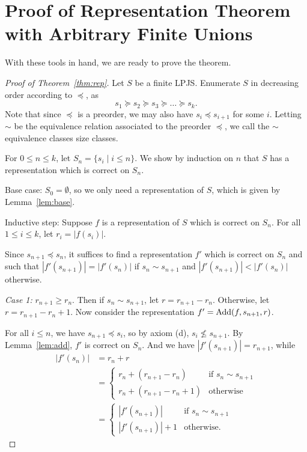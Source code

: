 \documentclass[12pt]{article}
\theoremstyle{definition}
\begin{document}
\section{Proof of Representation Theorem with Arbitrary Finite Unions}

With these tools in hand, we are ready to prove the theorem. 

\begin{proof}[Proof of Theorem~\ref{thm:rep}]
Let $S$ be a finite LPJS. Enumerate $S$ in decreasing order according to $\preceq$, as $$s_1\succeq s_2 \succeq s_3 \succeq \dots \succeq s_k.$$
Note that since $\preceq$ is a preorder, we may also have $s_i \preceq s_{i+1}$ for some $i$. Letting $\sim$ be the equivalence relation associated to the preorder $\preceq$, we call the $\sim$ equivalence classes size classes.

For $0\leq n \leq k$, let $S_n = \{s_i\mid i \leq n\}$. We show by induction on $n$ that $S$ has a representation which is correct on $S_n$.

Base case: $S_0 = \emptyset$, so we only need a representation of $S$, which is given by Lemma~\ref{lem:base}. 

Inductive step: Suppose $f$ is a representation of $S$ which is correct on $S_n$. For all $1\leq i \leq k$, let $r_i = |f(s_i)|$. 

Since $s_{n+1}\preceq s_n$, it suffices to find a representation $f'$ which is correct on $S_n$ and such that $|f'(s_{n+1})| = |f'(s_n)|$ if $s_n \sim s_{n+1}$ and $|f'(s_{n+1})| < |f'(s_n)|$ otherwise.

\emph{Case 1:} $r_{n+1} \geq r_n$. Then if $s_n\sim s_{n+1}$, let $r = r_{n+1} - r_n$. Otherwise, let $r = r_{n+1}-r_n+1$. Now consider the representation $f' = \text{Add}(f,s_{n+1},r)$. 

For all $i\leq n$, we have $s_{n+1}\preceq s_i$, so by axiom (d), $s_i\not\leq s_{n+1}$. By Lemma~\ref{lem:add}, $f'$ is correct on $S_n$. And we have $|f'(s_{n+1})| = r_{n+1}$, while \begin{align*}
    |f'(s_n)| &= r_n + r\\ &= \begin{cases} r_n + (r_{n+1}-r_n) & \text{if }s_n\sim s_{n+1}\\
r_n + (r_{n+1}-r_n+1) & \text{otherwise}\end{cases}\\
&= \begin{cases} |f'(s_{n+1})| & \text{if }s_n\sim s_{n+1}\\
|f'(s_{n+1})|+1 & \text{otherwise}.
\end{cases}
\end{align*}


\end{proof}
\end{document}
